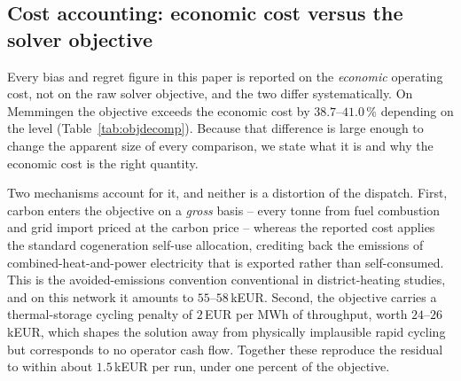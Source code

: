 
\subsection{Cost accounting: economic cost versus the solver objective}
\label{subsec:costacct}

Every bias and regret figure in this paper is reported on the \emph{economic} operating
cost, not on the raw solver objective, and the two differ systematically. On Memmingen the
objective exceeds the economic cost by $38.7$--$41.0$\,\% depending on the level
(Table~\ref{tab:objdecomp}). Because that difference is large enough to change the
apparent size of every comparison, we state what it is and why the economic cost is the
right quantity.

Two mechanisms account for it, and neither is a distortion of the dispatch. First, carbon
enters the objective on a \emph{gross} basis -- every tonne from fuel combustion and grid
import priced at the carbon price -- whereas the reported cost applies the standard
cogeneration self-use allocation, crediting back the emissions of combined-heat-and-power
electricity that is exported rather than self-consumed. This is the avoided-emissions
convention conventional in district-heating studies, and on this network it amounts to
$55$--$58$\,kEUR. Second, the objective carries a thermal-storage cycling penalty of
$2$\,EUR per MWh of throughput, worth $24$--$26$\,kEUR, which shapes the solution away from
physically implausible rapid cycling but corresponds to no operator cash flow. Together
these reproduce the residual to within about $1.5$\,kEUR per run, under one percent of the
objective.

